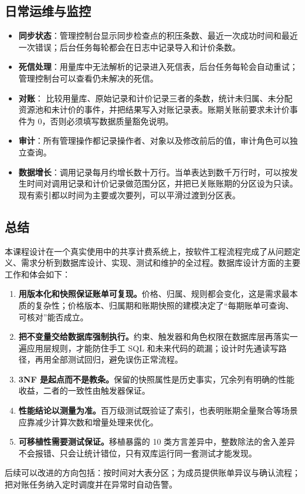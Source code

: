 \subsection{日常运维与监控}

\begin{itemize}
  \item \textbf{同步状态}：管理控制台显示同步检查点的积压条数、最近一次成功时间和最近一次错误；后台任务每轮都会在日志中记录导入和计价条数。
  \item \textbf{死信处理}：用量库中无法解析的记录进入死信表，后台任务每轮会自动重试；管理控制台可以查看仍未解决的死信。
  \item \textbf{对账}： 比较用量库、原始记录和计价记录三者的条数，统计未归属、未分配资源池和未计价的事件，并把结果写入对账记录表。账期关账前要求未计价事件为 0，否则必须填写数据质量豁免说明。
  \item \textbf{审计}：所有管理操作都记录操作者、对象以及修改前后的值，审计角色可以独立查询。
  \item \textbf{数据增长}：调用记录每月约增长数十万行。当单表达到数千万行时，可以按发生时间对调用记录和计价记录做范围分区，并把已关账账期的分区设为只读。现有索引都以时间为主要或次要列，可以平滑过渡到分区表。
\end{itemize}

\subsection{总结}

本课程设计在一个真实使用中的共享计费系统上，按软件工程流程完成了从问题定义、需求分析到数据库设计、实现、测试和维护的全过程。数据库设计方面的主要工作和体会如下：

\begin{enumerate}
  \item \textbf{用版本化和快照保证账单可复现。}价格、归属、规则都会变化，这是需求最本质的复杂性；价格版本、归属期和账期快照的建模决定了“每期账单可查询、可核对”能否成立。
  \item \textbf{把不变量交给数据库强制执行。}约束、触发器和角色权限在数据库层再落实一遍应用层规则，才能防住手工 SQL 和未来代码的疏漏；设计时先通读写路径，再用全部测试回归，避免误伤正常流程。
  \item \textbf{3NF 是起点而不是教条。}保留的快照属性是历史事实，冗余列有明确的性能收益，二者的一致性由触发器保证。
  \item \textbf{性能结论以测量为准。}百万级测试既验证了索引，也表明账期全量聚合等场景应靠减少计算次数和增量处理来优化。
  \item \textbf{可移植性需要测试保证。}移植暴露的 10 类方言差异中，整数除法的舍入差异不会报错、只会让统计错位，只有双库运行同一套测试才能发现。
\end{enumerate}

后续可以改进的方向包括：按时间对大表分区；为成员提供账单异议与确认流程；把对账任务纳入定时调度并在异常时自动告警。
